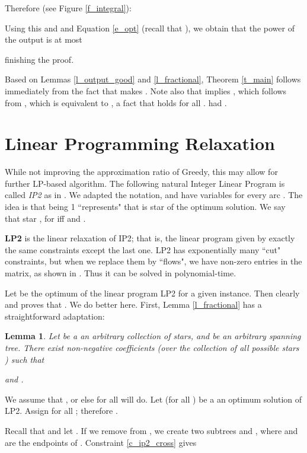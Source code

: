 \documentclass[12pt]{article}
\def\qed{ \ \vrule width.2cm height.2cm depth0cm\smallskip}
\def\proof{\noindent {\bf Proof. \ }}
\newtheorem{lemma}[proposition]{Lemma}
\begin{document}
Therefore (see Figure \ref{f_integral}):



Using this and  and
Equation \ref{e_opt} (recall that ), we obtain
that the power of the output is at most

finishing the proof.  
\qed


Based on Lemmas \ref{l_output_good}  and
\ref{l_fractional}, Theorem \ref{t_main} follows immediately from
the fact that  makes .
Note also that  implies , which
follows from , 
which is equivalent to , a fact that holds
for all . 
\cite{C10} had .


\section{Linear Programming Relaxation}

While not improving the approximation ratio of Greedy,
this may allow for further LP-based algorithm.
The following natural Integer Linear Program is called {\em IP2} as in
\cite{CQ12}. We adapted the notation,
and have variables  for every arc .
The idea is that  being 1 ``represents"  that  is 
star of the optimum solution.
We say that star ,
for 
iff  and .





{\bf LP2} is the linear relaxation of IP2; that is,
the linear program given by exactly the same constraints except
the last one. 
LP2 has exponentially many ``cut"
constraints, but when we replace them by ``flows", 
 we have  non-zero entries in the matrix, as shown in \cite{CQ12}.
Thus it can be solved in polynomial-time.

Let  be the optimum of the linear program LP2 for a given instance.
Then clearly  and \cite{CQ12} proves that 
.
We do better here. First, Lemma \ref{l_fractional} has a straightforward
adaptation:

\begin{lemma}
Let  be a an arbitrary collection of stars,
and  be an arbitrary spanning tree.
There exist non-negative coefficients  (over the collection of
all possible stars ) such that
 
and .
\label{l_fractional_lp}
\end{lemma}

\proof
We assume that , or else  for all  will do.
Let  (for all ) be a an optimum solution of LP2.
Assign  for all ; therefore
.

Recall that 
 and
let . 
If we remove  from , we create two subtrees
 and , where  and  are the endpoints of .
Constraint \ref{c_ip2_cross} gives
\end{document}
